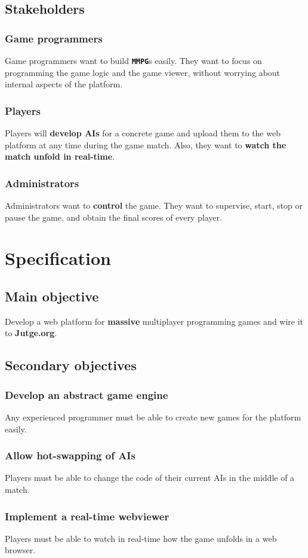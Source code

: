 \documentclass[a4paper,11pt,titlepage,abstract,numbers=noenddot,automark,mnsy,intlimits,rgb,dvipsnames]{report}
\begin{document}
\section{Stakeholders}
\subsection{Game programmers}
Game programmers want to build \textbf{\texttt{MMPG}}s easily. They want to focus on programming the game logic and the
game viewer, without worrying about internal aspects of the platform.
\subsection{Players}
Players will \textbf{develop \texttt{}AI\texttt{}s} for a concrete game and upload them to the web platform at any time during the game match.
Also, they want to \textbf{watch the match unfold in real-time}.
\subsection{Administrators}
Administrators want to \textbf{control} the game. They want to supervise, start,
stop or pause the game, and obtain the final scores of every player.
\clearpage
\chapter{Specification}
\section{Main objective}
Develop a web platform for \textbf{massive} multiplayer programming games and wire it to \textbf{Jutge.org}.
\section{Secondary objectives}
\subsection{Develop an abstract game engine}
Any experienced programmer must be able to create new games for the platform easily.
\subsection{Allow hot-swapping of AIs}
Players must be able to change the code of their current AIs in the middle of a match.
\subsection{Implement a real-time webviewer}
Players must be able to watch in real-time how the game unfolds in a web browser.
\end{document}
